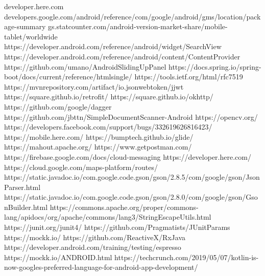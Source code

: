 \documentclass[10pt,twoside,a4paper]{report}
\begin{document}

\begin{thebibliography}{1}
   developer.here.com
   developers.google.com/android/reference/com/google/android/gms/location/package-summary
   gs.statcounter.com/android-version-market-share/mobile-tablet/worldwide
   https://developer.android.com/reference/android/widget/SearchView
   https://developer.android.com/reference/android/content/ContentProvider
   https://github.com/umano/AndroidSlidingUpPanel
   https://docs.spring.io/spring-boot/docs/current/reference/htmlsingle/
   https://tools.ietf.org/html/rfc7519
   https://mvnrepository.com/artifact/io.jsonwebtoken/jjwt
   https://square.github.io/retrofit/
   https://square.github.io/okhttp/
   https://github.com/google/dagger
   https://github.com/jbttn/SimpleDocumentScanner-Android
   https://opencv.org/
   https://developers.facebook.com/support/bugs/332619626816423/
   https://mobile.here.com/
   https://bumptech.github.io/glide/
   https://mahout.apache.org/
   https://www.getpostman.com/
   https://firebase.google.com/docs/cloud-messaging
   https://developer.here.com/
   https://cloud.google.com/maps-platform/routes/
   https://static.javadoc.io/com.google.code.gson/gson/2.8.5/com/google/gson/JsonParser.html
   https://static.javadoc.io/com.google.code.gson/gson/2.8.0/com/google/gson/GsonBuilder.html
   https://commons.apache.org/proper/commons-lang/apidocs/org/apache/commons/lang3/StringEscapeUtils.html
   https://junit.org/junit4/
   https://github.com/Pragmatists/JUnitParams
   https://mockk.io/
   https://github.com/ReactiveX/RxJava
   https://developer.android.com/training/testing/espresso
   https://mockk.io/ANDROID.html
   https://techcrunch.com/2019/05/07/kotlin-is-now-googles-preferred-language-for-android-app-development/
\end{thebibliography}


\listoffigures
\listoftables
\end{document}
